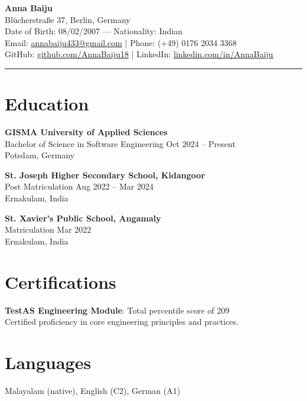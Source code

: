 \documentclass[10pt,a4paper]{article}
\begin{document}
\begin{center}
    {\LARGE \textbf{Anna Baiju}} \\
    Blücherstraße 37, Berlin, Germany \\
    Date of Birth: 08/02/2007 \quad --- \quad Nationality: Indian \\
    Email: \href{mailto:annabaiju433@gmail.com}{annabaiju433@gmail.com} \quad | \quad
    Phone: (+49) 0176 2034 3368 \\
    GitHub: \href{https://github.com/AnnaBaiju18}{github.com/AnnaBaiju18} \quad | \quad
    LinkedIn: \href{https://www.linkedin.com/in/anna-baiju-524300359/}{linkedin.com/in/AnnaBaiju}
\end{center}

\vspace{0.3cm}
\hrule
\vspace{0.5cm}


\section*{Education}
\textbf{GISMA University of Applied Sciences} \\
Bachelor of Science in Software Engineering \hfill Oct 2024 – Present \\
Potsdam, Germany

\vspace{0.3cm}
\textbf{St. Joseph Higher Secondary School, Kidangoor} \\
Post Matriculation \hfill Aug 2022 – Mar 2024 \\
Ernakulam, India

\vspace{0.3cm}
\textbf{St. Xavier’s Public School, Angamaly} \\
Matriculation \hfill Mar 2022 \\
Ernakulam, India


\section*{Certifications}
\textbf{TestAS Engineering Module}: Total percentile score of 209 \\
Certified proficiency in core engineering principles and practices.


\section*{Languages}
Malayalam (native), English (C2), German (A1)
\end{document}
